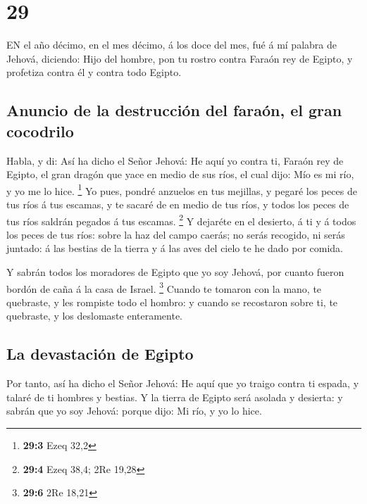 \hypertarget{section-28}{%
\section{29}\label{section-28}}

 EN el año décimo, en el mes décimo, á los doce del mes, fué
á mí palabra de Jehová, diciendo:  Hijo del hombre, pon tu
rostro contra Faraón rey de Egipto, y profetiza contra él y contra todo
Egipto.

\hypertarget{anuncio-de-la-destrucciuxf3n-del-farauxf3n-el-gran-cocodrilo}{%
\subsection{Anuncio de la destrucción del faraón, el gran
cocodrilo}\label{anuncio-de-la-destrucciuxf3n-del-farauxf3n-el-gran-cocodrilo}}

 Habla, y di: Así ha dicho el Señor Jehová: He aquí yo
contra ti, Faraón rey de Egipto, el gran dragón que yace en medio de sus
ríos, el cual dijo: Mío es mi río, y yo me lo hice. \footnote{\textbf{29:3}
  Ezeq 32,2}  Yo pues, pondré anzuelos en tus mejillas, y
pegaré los peces de tus ríos á tus escamas, y te sacaré de en medio de
tus ríos, y todos los peces de tus ríos saldrán pegados á tus escamas.
\footnote{\textbf{29:4} Ezeq 38,4; 2Re 19,28}  Y dejaréte en
el desierto, á ti y á todos los peces de tus ríos: sobre la haz del
campo caerás; no serás recogido, ni serás juntado: á las bestias de la
tierra y á las aves del cielo te he dado por comida.

 Y sabrán todos los moradores de Egipto que yo soy Jehová,
por cuanto fueron bordón de caña á la casa de Israel. \footnote{\textbf{29:6}
  2Re 18,21}  Cuando te tomaron con la mano, te quebraste, y
les rompiste todo el hombro: y cuando se recostaron sobre ti, te
quebraste, y los deslomaste enteramente.

\hypertarget{la-devastaciuxf3n-de-egipto}{%
\subsection{La devastación de
Egipto}\label{la-devastaciuxf3n-de-egipto}}

 Por tanto, así ha dicho el Señor Jehová: He aquí que yo
traigo contra ti espada, y talaré de ti hombres y bestias. 
Y la tierra de Egipto será asolada y desierta: y sabrán que yo soy
Jehová: porque dijo: Mi río, y yo lo hice.

